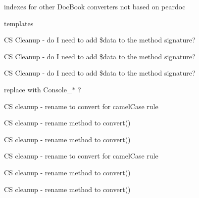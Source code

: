 \begin{DoxyRefList}
indexes for other \-Doc\-Book converters not based on peardoc 

templates  
\item[\label{todo__todo000092}%
\hypertarget{todo__todo000092}{}%
\-Global \hyperlink{class_error_tracker_a3a280f3829918777acb4ade45dc30f0c}{\-Error\-Tracker} (\$num)]\-C\-S \-Cleanup -\/ do \-I need to add \$data to the method signature?  
\item[\label{todo__todo000093}%
\hypertarget{todo__todo000093}{}%
\-Global \hyperlink{class_error_tracker_a9345af0d3e0611560db17e1c7386c912}{\-Error\-Tracker} (\$num)]\-C\-S \-Cleanup -\/ do \-I need to add \$data to the method signature?  
\item[\label{todo__todo000091}%
\hypertarget{todo__todo000091}{}%
\-Global \hyperlink{class_error_tracker_a0ed443a8eae207cb1cc1df9a377e4ab8}{\-Error\-Tracker} (\$num)]\-C\-S \-Cleanup -\/ do \-I need to add \$data to the method signature?  
\item[\label{todo__todo000120}%
\hypertarget{todo__todo000120}{}%
\-Global \hyperlink{class_io_af4e34ed91ae0971aa317016bbd76b8c3}{\-Io} ()]replace with \-Console\-\_\-$\ast$ ?  
\item[\label{todo__todo000065}%
\hypertarget{todo__todo000065}{}%
\-Global \hyperlink{classparser_access_tag_a31e57fd66b58b300f8a489aa1b9431f6}{parser\-Access\-Tag} (\&\$converter)]\-C\-S cleanup -\/ rename to convert for camel\-Case rule  
\item[\label{todo__todo000034}%
\hypertarget{todo__todo000034}{}%
\-Global \hyperlink{classparser_b_ad6c06bea9d11cc1c362b592306cfa707}{parser\-B} (\&\$c)]\-C\-S cleanup -\/ rename method to convert()  
\item[\label{todo__todo000039}%
\hypertarget{todo__todo000039}{}%
\-Global \hyperlink{classparser_br_ad6c06bea9d11cc1c362b592306cfa707}{parser\-Br} (\&\$c)]\-C\-S cleanup -\/ rename method to convert()  
\item[\label{todo__todo000136}%
\hypertarget{todo__todo000136}{}%
\-Global \hyperlink{classparser_c_data_a77af191d91c08203fe89824e3909a3f8}{parser\-C\-Data} (\&\$c, \$postprocess=true)]\-C\-S cleanup -\/ rename to convert for camel\-Case rule  
\item[\label{todo__todo000032}%
\hypertarget{todo__todo000032}{}%
\-Global \hyperlink{classparser_code_ad6c06bea9d11cc1c362b592306cfa707}{parser\-Code} (\&\$c)]\-C\-S cleanup -\/ rename method to convert()  
\item[\label{todo__todo000036}%
\hypertarget{todo__todo000036}{}%
\-Global \hyperlink{classparser_desc_var_ad6c06bea9d11cc1c362b592306cfa707}{parser\-Desc\-Var} (\&\$c)]\-C\-S cleanup -\/ rename method to convert()  

\end{DoxyRefList}

